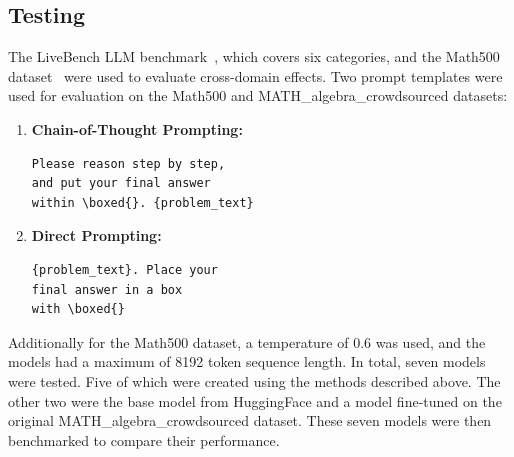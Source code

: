 \documentclass[10pt]{article}
\begin{document}
\subsection{Testing}
The LiveBench LLM benchmark~\cite{livebench}, which covers six categories, and the Math500 dataset~\cite{lightman2023lets} were used to evaluate cross-domain effects. Two prompt templates were used for evaluation on the Math500 and MATH\_algebra\_crowdsourced datasets:
\begin{enumerate}
    \item \textbf{Chain-of-Thought Prompting:}
    \begin{verbatim}
Please reason step by step, 
and put your final answer 
within \boxed{}. {problem_text}
    \end{verbatim}
    \item \textbf{Direct Prompting:}
    \begin{verbatim}
{problem_text}. Place your 
final answer in a box 
with \boxed{}
    \end{verbatim}
\end{enumerate}
Additionally for the Math500 dataset, a temperature of 0.6 was used, and the models had a maximum of 8192 token sequence length. In total, seven models were tested. Five of which were created using the methods described above. The other two were the base model from HuggingFace and a model fine-tuned on the original MATH\_algebra\_crowdsourced dataset. These seven models were then benchmarked to compare their performance.
\end{document}
